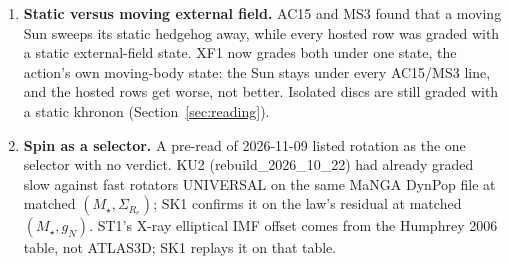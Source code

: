 \documentclass[10pt]{article}
\begin{document}
\begin{enumerate}
\item \textbf{Static versus moving external field.} AC15 and MS3 found that a moving Sun sweeps its static hedgehog away, while every hosted row was graded with a static external-field state. XF1 now grades both under one state, the action's own moving-body state: the Sun stays under every AC15/MS3 line, and the hosted rows get worse, not better. Isolated discs are still graded with a static khronon (Section~\ref{sec:reading}).
\item \textbf{Spin as a selector.} A pre-read of 2026-11-09 listed rotation as the one selector with no verdict. KU2 (rebuild\_2026\_10\_22) had already graded slow against fast rotators UNIVERSAL on the same MaNGA DynPop file at matched $(M_\star,\Sigma_{R_e})$; SK1 confirms it on the law's residual at matched $(M_\star,g_N)$. ST1's X-ray elliptical IMF offset comes from the Humphrey 2006 table, not ATLAS3D; SK1 replays it on that table.
\end{enumerate}
\end{document}

